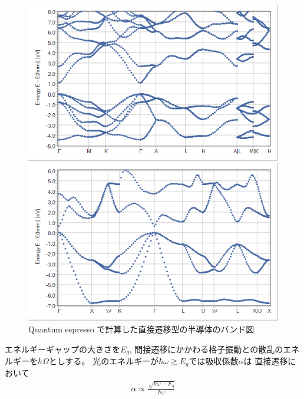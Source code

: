 \documentclass[11pt,dvipdfmx,a4paper]{jsarticle}
\begin{document}
\begin{figure}[H]
    \begin{minipage}[t]{0.48\columnwidth}
    \centering
    \includegraphics[width = \columnwidth]{band/CdS.png}
    \end{minipage}
    \hfil
    \begin{minipage}[t]{0.48\columnwidth}
        \centering
        \includegraphics[width = \columnwidth]{band/GaAs.png}
    \end{minipage}
    \caption{Quantum espresso で計算した直接遷移型の半導体のバンド図}
    \label{band}
\end{figure}
エネルギーギャップの大きさを\(E_g\), 間接遷移にかかわる格子振動との散乱のエネルギーを\(\hbar\Omega\)としする。
光のエネルギーが\(\hbar\omega \gtrsim E_g\)では吸収係数\(\alpha\)は
直接遷移において
\begin{align}
    \alpha \propto \frac{\sqrt{\hbar\omega -E_g}}{\hbar \omega}
\end{align}
\end{document}
